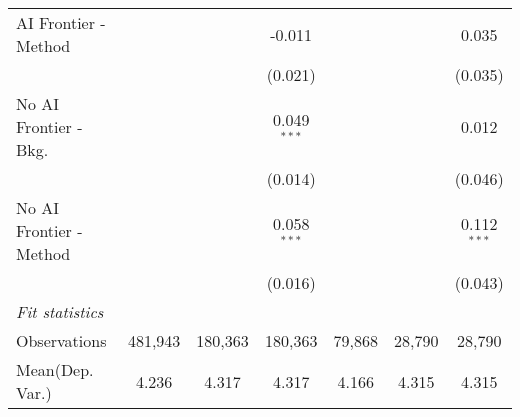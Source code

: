 \begin{tabular}{lcccccc}
   AI Frontier - Method    &               &               & -0.011        &               &              & 0.035\\   
                           &               &               & (0.021)       &               &              & (0.035)\\   
   No AI Frontier - Bkg.   &               &               & 0.049$^{***}$ &               &              & 0.012\\   
                           &               &               & (0.014)       &               &              & (0.046)\\   
   No AI Frontier - Method &               &               & 0.058$^{***}$ &               &              & 0.112$^{***}$\\   
                           &               &               & (0.016)       &               &              & (0.043)\\   
   \midrule
   \emph{Fit statistics}\\
   Observations            & 481,943       & 180,363       & 180,363       & 79,868        & 28,790       & 28,790\\  
Mean(Dep. Var.) & 4.236 & 4.317 & 4.317 & 4.166 & 4.315 & 4.315 \\
   

\end{tabular}
